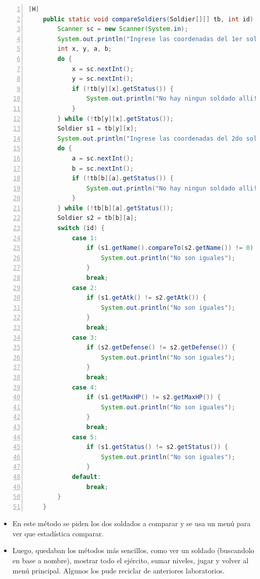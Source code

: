 \documentclass{article}
\begin{document}
	\begin{lstlisting}[language=java,caption={Compare Soldier}, numbers=left][H]
	public static void compareSoldiers(Soldier[][] tb, int id) {
        Scanner sc = new Scanner(System.in);
        System.out.println("Ingrese las coordenadas del 1er soldado a comparar");
        int x, y, a, b;
        do {
            x = sc.nextInt();
            y = sc.nextInt();
            if (!tb[y][x].getStatus()) {
                System.out.println("No hay ningun soldado alli!");
            }
        } while (!tb[y][x].getStatus());
        Soldier s1 = tb[y][x];
        System.out.println("Ingrese las coordenadas del 2do soldado a comparar");
        do {
            a = sc.nextInt();
            b = sc.nextInt();
            if (!tb[b][a].getStatus()) {
                System.out.println("No hay ningun soldado alli!");
            }
        } while (!tb[b][a].getStatus());
        Soldier s2 = tb[b][a];
        switch (id) {
            case 1:
                if (s1.getName().compareTo(s2.getName()) != 0) {
                    System.out.println("No son iguales");
                }
                break;
            case 2:
                if (s1.getAtk() != s2.getAtk()) {
                    System.out.println("No son iguales");
                }
                break;
            case 3:
                if (s2.getDefense() != s2.getDefense()) {
                    System.out.println("No son iguales");
                }
                break;
            case 4:
                if (s1.getMaxHP() != s2.getMaxHP()) {
                    System.out.println("No son iguales");
                }
                break;
            case 5:
                if (s1.getStatus() != s2.getStatus()) {
                    System.out.println("No son iguales");
                }
            default:
                break;
        }
    }
	\end{lstlisting}
	
	\begin{itemize}	
		\item En este método se piden los dos soldados a comparar y se usa un menú para ver que estadística comparar.
		\item Luego, quedaban los métodos más sencillos, como ver un soldado (buscandolo en base a nombre), mostrar todo el ejército, sumar niveles, jugar y volver al menú principal. Algunos los pude reciclar de anteriores laboratorios.
	\end{itemize}
	
\end{document}
